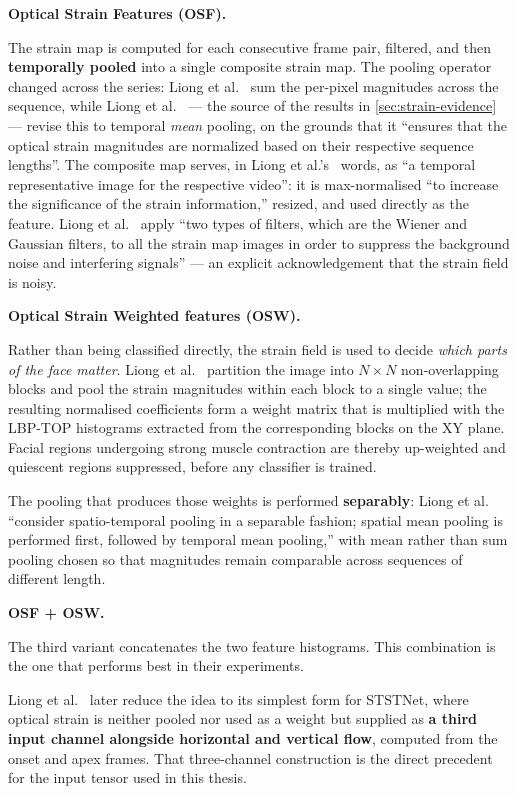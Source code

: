 \textbf{Optical Strain Features (OSF).}

The strain map is computed for each consecutive frame pair, filtered, and then \textbf{temporally pooled} into a single composite strain map. The pooling operator changed across the series: Liong et al.~\cite{liong2014a,liong2014b} sum the per-pixel magnitudes across the sequence, while Liong et al.~\cite{liong2016} --- the source of the results in \autoref{sec:strain-evidence} --- revise this to temporal \textit{mean} pooling, on the grounds that it ``ensures that the optical strain magnitudes are normalized based on their respective sequence lengths''. The composite map serves, in Liong et al.'s~\cite{liong2014a} words, as ``a temporal representative image for the respective video'': it is max-normalised ``to increase the significance of the strain information,'' resized, and used directly as the feature. Liong et al.~\cite{liong2014a} apply ``two types of filters, which are the Wiener and Gaussian filters, to all the strain map images in order to suppress the background noise and interfering signals'' --- an explicit acknowledgement that the strain field is noisy.

\textbf{Optical Strain Weighted features (OSW).}

Rather than being classified directly, the strain field is used to decide \textit{which parts of the face matter}. Liong et al.~\cite{liong2014b} partition the image into $N \times N$ non-overlapping blocks and pool the strain magnitudes within each block to a single value; the resulting normalised coefficients form a weight matrix that is multiplied with the LBP-TOP histograms extracted from the corresponding blocks on the XY plane. Facial regions undergoing strong muscle contraction are thereby up-weighted and quiescent regions suppressed, before any classifier is trained.

The pooling that produces those weights is performed \textbf{separably}: Liong et al.~\cite{liong2016} ``consider spatio-temporal pooling in a separable fashion; spatial mean pooling is performed first, followed by temporal mean pooling,'' with mean rather than sum pooling chosen so that magnitudes remain comparable across sequences of different length.

\textbf{OSF + OSW.}

The third variant concatenates the two feature histograms. This combination is the one that performs best in their experiments.

Liong et al.~\cite{liong2019b} later reduce the idea to its simplest form for STSTNet, where optical strain is neither pooled nor used as a weight but supplied as \textbf{a third input channel alongside horizontal and vertical flow}, computed from the onset and apex frames. That three-channel construction is the direct precedent for the input tensor used in this thesis.

